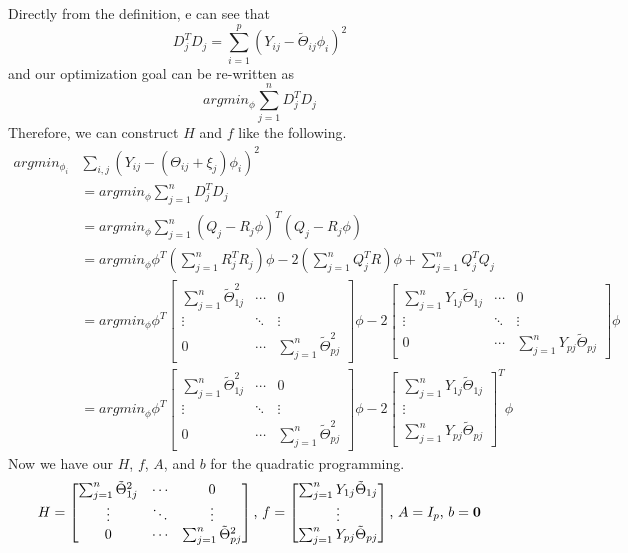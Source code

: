 \documentclass[11pt]{article}
\begin{document}
\begin{itemize}
\noindent Directly from the definition, e can see that
$$D_j^T D_j = \sum_{i=1}^{p} (Y_{ij}-\tilde{\Theta}_{ij} \phi_i)^2$$
and our optimization goal can be re-written as
$$argmin_{\phi} \sum_{j=1}^{n} D_j^T D_j$$
\noindent Therefore, we can construct $H$ and $f$ like the following.
\begin{align*}
argmin_{\phi_i} &\sum_{i,j}(Y_{ij} - (\Theta_{ij}+\xi_j)\phi_i)^2 \\
&= argmin_{\phi} \sum_{j=1}^{n} D_j^T D_j\\
&= argmin_{\phi} \sum_{j=1}^{n} (Q_j - R_j \phi)^T (Q_j - R_j \phi)\\
&= argmin_{\phi} \phi^T (\sum_{j=1}^n R_j^T R_j) \phi 
- 2(\sum_{j=1}^{n}Q_j^TR)\phi + \sum_{j=1}^{n} Q_j^T Q_j\\
&= argmin_{\phi} 
\phi^T \begin{bmatrix}
\sum_{j=1}^{n} \tilde{\Theta}_{1j}^2 & \cdots & 0\\
\vdots & \ddots & \vdots\\
0 & \cdots & \sum_{j=1}^{n} \tilde{\Theta}_{pj}^2
\end{bmatrix}\phi
-2 \begin{bmatrix}
\sum_{j=1}^{n}Y_{1j}\tilde{\Theta}_{1j} & \cdots & 0\\
\vdots & \ddots & \vdots\\
0 & \cdots & \sum_{j=1}^{n} Y_{pj} \tilde{\Theta}_{pj}
\end{bmatrix}\phi\\
&= argmin_{\phi} 
\phi^T \begin{bmatrix}
\sum_{j=1}^{n} \tilde{\Theta}_{1j}^2 & \cdots & 0\\
\vdots & \ddots & \vdots\\
0 & \cdots & \sum_{j=1}^{n} \tilde{\Theta}_{pj}^2
\end{bmatrix}\phi
-2 \begin{bmatrix}
\sum_{j=1}^{n}Y_{1j}\tilde{\Theta}_{1j} \\
\vdots \\
\sum_{j=1}^{n} Y_{pj} \tilde{\Theta}_{pj}
\end{bmatrix}^T \phi
\end{align*}
Now we have our $H$, $f$, $A$, and $b$ for the quadratic programming.
$$H = \begin{bmatrix}
\sum_{j=1}^{n} \tilde{\Theta}_{1j}^2 & \cdots & 0\\
\vdots & \ddots & \vdots\\
0 & \cdots & \sum_{j=1}^{n} \tilde{\Theta}_{pj}^2
\end{bmatrix}\text{,  }f = \begin{bmatrix}
\sum_{j=1}^{n}Y_{1j}\tilde{\Theta}_{1j} \\
\vdots \\
\sum_{j=1}^{n} Y_{pj} \tilde{\Theta}_{pj}
\end{bmatrix}\text{,  } A = I_{p} \text{,  }b = \bf{0}$$
\end{itemize}
\end{document}
